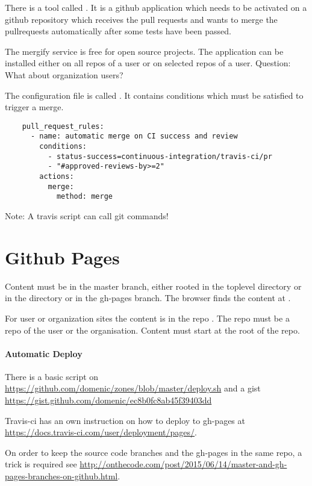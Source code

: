 There is a tool called . It is a github application which needs
to be activated on a github repository which receives the pull requests and
wants to merge the pullrequests automatically after some tests have been
passed.

The mergify service is free for open source projects. The application can be
installed either on all repos of a user or on selected repos of a
user. Question: What about organization users?


The configuration file is called . It contains conditions
which must be satisfied to trigger a merge.

{\small
\begin{verbatim}
    pull_request_rules:
      - name: automatic merge on CI success and review
        conditions:
          - status-success=continuous-integration/travis-ci/pr
          - "#approved-reviews-by>=2"
        actions:
          merge:
            method: merge
\end{verbatim}
}

Note: A travis script can call git commands!


\section{Github Pages}

Content must be in the master branch, either rooted in the toplevel directory
or in the directory  or in the gh-pages branch. The browser finds
the content at .

For user or organization sites the content is in the repo
. The repo must be a repo of the user or the
organisation. Content must start at the root of the repo.


\paragraph{Automatic Deploy}
There is a basic script on
\url{https://github.com/domenic/zones/blob/master/deploy.sh} and a gist
\url{https://gist.github.com/domenic/ec8b0fc8ab45f39403dd}


Travis-ci has an own instruction on how to deploy to gh-pages at
\url{https://docs.travis-ci.com/user/deployment/pages/}.

On order to keep the source code branches and the gh-pages in the same repo, a
trick is required see
\url{http://onthecode.com/post/2015/06/14/master-and-gh-pages-branches-on-github.html}.


